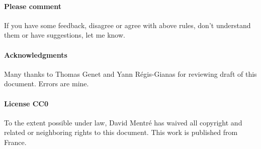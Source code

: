 \documentclass[a4paper]{article}
\begin{document}
\paragraph{Please comment} If you have some feedback, disagree or agree
with above rules, don't understand them or have suggestions, let me
know.

\paragraph{Acknowledgments} Many thanks to Thomas Genet and Yann
Régis-Gianas for reviewing draft of this document. Errors are mine.

\paragraph{License CC0} To the extent possible under law, David Mentré
has waived all copyright and related or neighboring rights to this
document. This work is published from France.



\end{document}
